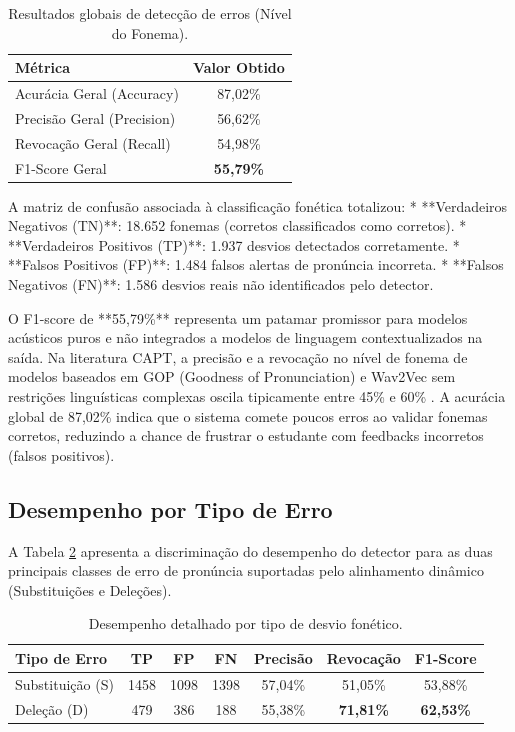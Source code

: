 \documentclass[12pt]{article}
\begin{document}
\begin{table}[ht]
\centering
\caption{Resultados globais de detecção de erros (Nível do Fonema).}
\label{tab:metricas_globais}
\begin{tabular}{lc}
\toprule
\textbf{Métrica} & \textbf{Valor Obtido} \\
\midrule
Acurácia Geral (Accuracy) & 87,02\% \\
Precisão Geral (Precision) & 56,62\% \\
Revocação Geral (Recall) & 54,98\% \\
F1-Score Geral & \textbf{55,79\%} \\
\bottomrule
\end{tabular}
\end{table}

A matriz de confusão associada à classificação fonética totalizou:
* **Verdadeiros Negativos (TN)**: 18.652 fonemas (corretos classificados como corretos).
* **Verdadeiros Positivos (TP)**: 1.937 desvios detectados corretamente.
* **Falsos Positivos (FP)**: 1.484 falsos alertas de pronúncia incorreta.
* **Falsos Negativos (FN)**: 1.586 desvios reais não identificados pelo detector.

O F1-score de **55,79\%** representa um patamar promissor para modelos acústicos puros e não integrados a modelos de linguagem contextualizados na saída. Na literatura CAPT, a precisão e a revocação no nível de fonema de modelos baseados em GOP (Goodness of Pronunciation) e Wav2Vec sem restrições linguísticas complexas oscila tipicamente entre 45\% e 60\% \cite{witt2000phone}. A acurácia global de 87,02\% indica que o sistema comete poucos erros ao validar fonemas corretos, reduzindo a chance de frustrar o estudante com feedbacks incorretos (falsos positivos).

\subsection{Desempenho por Tipo de Erro}
A Tabela \ref{tab:erro_tipo} apresenta a discriminação do desempenho do detector para as duas principais classes de erro de pronúncia suportadas pelo alinhamento dinâmico (Substituições e Deleções).

\begin{table}[ht]
\centering
\caption{Desempenho detalhado por tipo de desvio fonético.}
\label{tab:erro_tipo}
\begin{tabular}{lcccccc}
\toprule
\textbf{Tipo de Erro} & \textbf{TP} & \textbf{FP} & \textbf{FN} & \textbf{Precisão} & \textbf{Revocação} & \textbf{F1-Score} \\
\midrule
Substituição (S) & 1458 & 1098 & 1398 & 57,04\% & 51,05\% & 53,88\% \\
Deleção (D) & 479 & 386 & 188 & 55,38\% & \textbf{71,81\%} & \textbf{62,53\%} \\
\bottomrule
\end{tabular}
\end{table}
\end{document}
